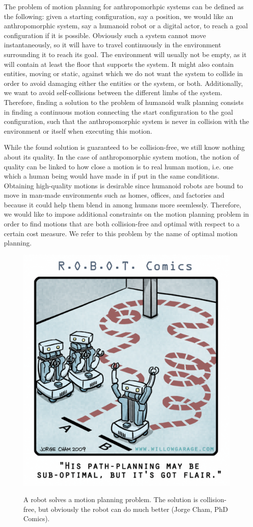 The problem of motion planning for anthropomorhpic systems can be
defined as the following: given a starting configuration, say a
position, we would like an anthropomorphic system, say a humanoid
robot or a digital actor, to reach a goal configuration if it is
possible. Obviously such a system cannot move instantaneously, so it
will have to travel continuously in the environment surrounding it to
reach its goal. The environment will usually not be empty, as it will
contain at least the floor that supports the system. It might also
contain entities, moving or static, against which we do not want the
system to collide in order to avoid damaging either the entities or
the system, or both. Additionally, we want to avoid self-collisions
between the different limbs of the system. Therefore, finding a
solution to the problem of humanoid walk planning consists in finding
a continuous motion connecting the start configuration to the goal
configuration, such that the anthropomorphic system is never in
collision with the environment or itself when executing this motion.

While the found solution is guaranteed to be collision-free, we still
know nothing about its quality. In the case of anthropomorphic system
motion, the notion of quality can be linked to how close a motion is
to real human motion, i.e. one which a human being would have made in
if put in the same conditions. Obtaining high-quality motions is
desirable since humanoid robots are bound to move in man-made
environments such as homes, offices, and factories and because it
could help them blend in among humans more seemlessly. Therefore, we
would like to impose additional constraints on the motion planning
problem in order to find motions that are both collision-free and
optimal with respect to a certain cost measure. We refer to this
problem by the name of optimal motion planning.

\begin{figure}[h!]
  \centering
      {\includegraphics[width = 0.6\linewidth]
        {src/chap0-introduction/optimal-motion-planning.png}}
      \caption{A robot solves a motion planning problem. The solution
        is collision-free, but obviously the robot can do much better
        (Jorge Cham, PhD Comics).}
      \label{fig:chap0-optimal-motion-planning}
\end{figure}

